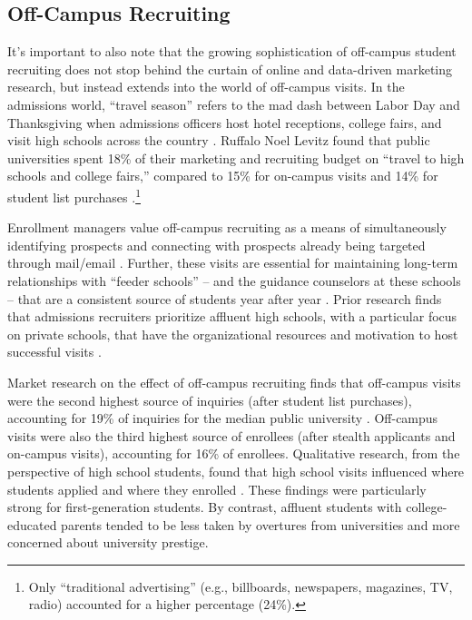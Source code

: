 \documentclass{article}
\begin{document}
\subsection*{Off-Campus Recruiting}

It's important to also note that the growing sophistication of off-campus student recruiting does not stop behind the curtain of online and data-driven marketing research, but instead extends into the world of off-campus visits. In the admissions world, ``travel season'' refers to the mad dash between Labor Day and Thanksgiving when admissions officers host hotel receptions, college fairs, and visit high schools across the country \citep{RN3519}. Ruffalo Noel Levitz found that public universities spent 18\% of their marketing and recruiting budget on ``travel to high schools and college fairs,'' compared to 15\% for on-campus visits and 14\% for student list purchases \citep{RN4402}.\footnote{Only ``traditional advertising'' (e.g., billboards, newspapers, magazines, TV, radio) accounted for a higher percentage (24\%).}

Enrollment managers value off-campus recruiting as a means of simultaneously identifying prospects and connecting with prospects already being targeted through mail/email \citep{RN4323, RN4315, RN3519}. Further, these visits are essential for maintaining long-term relationships with ``feeder schools'' -- and the guidance counselors at these schools -- that are a consistent source of students year after year \citep{RN3519, RN4402}. Prior research finds that admissions recruiters prioritize affluent high schools, with a particular focus on private schools, that have the organizational resources and motivation to host successful visits \citep{RN3519}.

Market research on the effect of off-campus recruiting finds that off-campus visits were the second highest source of inquiries (after student list purchases), accounting for 19\% of inquiries for the median public university \citep{RN4402}. Off-campus visits were also the third highest source of enrollees (after stealth applicants and on-campus visits), accounting for 16\% of enrollees.  Qualitative research, from the perspective of high school students, found that high school visits influenced where students applied and where they enrolled \citep{RN4324}. These findings were particularly strong for first-generation students. By contrast, affluent students with college-educated parents tended to be less taken by overtures from universities and more concerned about university prestige.
\end{document}
